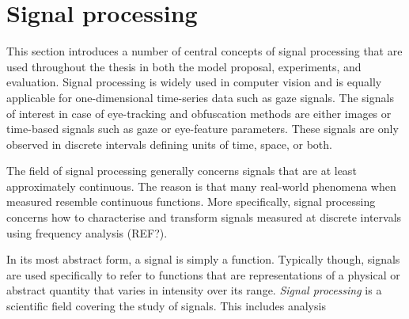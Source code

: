 




\section{Signal processing}
This section introduces a number of central concepts of signal processing that are used throughout the thesis in both the model proposal, experiments, and evaluation. Signal processing is widely used in computer vision and is equally applicable for one-dimensional time-series data such as gaze signals. The signals of interest in case of eye-tracking and obfuscation methods are either images or time-based signals such as gaze or eye-feature parameters. These signals are only observed in discrete intervals defining units of time, space, or both. 

The field of signal processing generally concerns signals that are at least approximately continuous. The reason is that many real-world phenomena when measured resemble continuous functions. More specifically, signal processing concerns how to characterise and transform signals measured at discrete intervals using frequency analysis (REF?).  



In its most abstract form, a signal is simply a function. Typically though, signals are used specifically to refer to functions that are representations of a physical or abstract quantity that varies in intensity over its range. \emph{Signal processing} is a scientific field covering the study of signals. This includes analysis 

